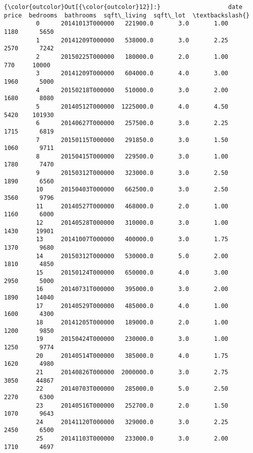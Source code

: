 \documentclass[11pt]{article}
\begin{document}
\begin{Verbatim}[commandchars=\\\{\}]
{\color{outcolor}Out[{\color{outcolor}12}]:}                   date      price  bedrooms  bathrooms  sqft\_living  sqft\_lot  \textbackslash{}
         0      20141013T000000   221900.0       3.0       1.00         1180      5650   
         1      20141209T000000   538000.0       3.0       2.25         2570      7242   
         2      20150225T000000   180000.0       2.0       1.00          770     10000   
         3      20141209T000000   604000.0       4.0       3.00         1960      5000   
         4      20150218T000000   510000.0       3.0       2.00         1680      8080   
         5      20140512T000000  1225000.0       4.0       4.50         5420    101930   
         6      20140627T000000   257500.0       3.0       2.25         1715      6819   
         7      20150115T000000   291850.0       3.0       1.50         1060      9711   
         8      20150415T000000   229500.0       3.0       1.00         1780      7470   
         9      20150312T000000   323000.0       3.0       2.50         1890      6560   
         10     20150403T000000   662500.0       3.0       2.50         3560      9796   
         11     20140527T000000   468000.0       2.0       1.00         1160      6000   
         12     20140528T000000   310000.0       3.0       1.00         1430     19901   
         13     20141007T000000   400000.0       3.0       1.75         1370      9680   
         14     20150312T000000   530000.0       5.0       2.00         1810      4850   
         15     20150124T000000   650000.0       4.0       3.00         2950      5000   
         16     20140731T000000   395000.0       3.0       2.00         1890     14040   
         17     20140529T000000   485000.0       4.0       1.00         1600      4300   
         18     20141205T000000   189000.0       2.0       1.00         1200      9850   
         19     20150424T000000   230000.0       3.0       1.00         1250      9774   
         20     20140514T000000   385000.0       4.0       1.75         1620      4980   
         21     20140826T000000  2000000.0       3.0       2.75         3050     44867   
         22     20140703T000000   285000.0       5.0       2.50         2270      6300   
         23     20140516T000000   252700.0       2.0       1.50         1070      9643   
         24     20141120T000000   329000.0       3.0       2.25         2450      6500   
         25     20141103T000000   233000.0       3.0       2.00         1710      4697   

\end{Verbatim}
\end{document}
